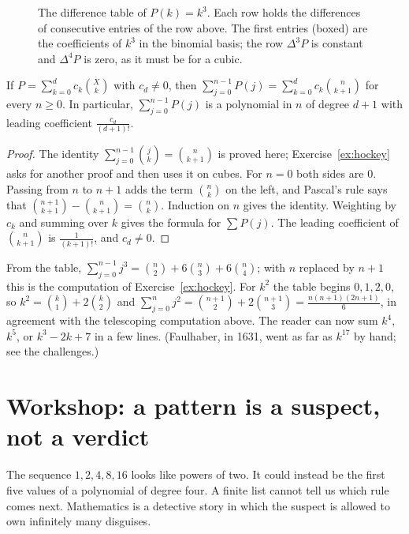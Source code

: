 \begin{figure}[ht]
\centering
{}
\caption{The difference table of $P(k)=k^3$. Each row holds the differences of consecutive entries of the row above. The first entries (boxed) are the coefficients of $k^3$ in the binomial basis; the row $\Delta^3P$ is constant and $\Delta^4P$ is zero, as it must be for a cubic.}
\label{fig:differences}
\end{figure}

\begin{corollary}\label{cor:sumpoly}
If $P=\sum_{k=0}^dc_k\binom Xk$ with $c_d\ne0$, then $\displaystyle\sum_{j=0}^{n-1}P(j)=\sum_{k=0}^dc_k\binom n{k+1}$ for every $n\ge0$.
In particular, $\sum_{j=0}^{n-1}P(j)$ is a polynomial in $n$ of degree $d+1$ with leading coefficient $\frac{c_d}{(d+1)!}$.
\end{corollary}
\begin{proof}
The identity $\sum_{j=0}^{n-1}\binom jk=\binom n{k+1}$ is proved here; Exercise~\ref{ex:hockey} asks for another proof and then uses it on cubes. For $n=0$ both sides are $0$. Passing from $n$ to $n+1$ adds the term $\binom nk$ on the left, and Pascal's rule says that $\binom{n+1}{k+1}-\binom n{k+1}=\binom nk$. Induction on $n$ gives the identity. Weighting by $c_k$ and summing over $k$ gives the formula for $\sum P(j)$. The leading coefficient of $\binom n{k+1}$ is $\frac1{(k+1)!}$, and $c_d\ne0$.
\end{proof}

\begin{examplex}
From the table, $\sum_{j=0}^{n-1}j^3=\binom n2+6\binom n3+6\binom n4$; with $n$ replaced by $n+1$ this is the computation of Exercise~\ref{ex:hockey}.
For $k^2$ the table begins $0,1,2,0$, so $k^2=\binom k1+2\binom k2$ and $\sum_{j=0}^{n}j^2=\binom{n+1}2+2\binom{n+1}3=\frac{n(n+1)(2n+1)}6$, in agreement
with the telescoping computation above. The reader can now sum $k^4$, $k^5$, or $k^3-2k+7$ in a few lines. (Faulhaber, in 1631, went as far as $k^{17}$ by hand; see the challenges.)
\end{examplex}


\section{Workshop: a pattern is a suspect, not a verdict}
The sequence $1,2,4,8,16$ looks like powers of two. It could instead be the first five values of a polynomial of degree four. A finite list cannot tell us which rule comes next. Mathematics is a detective story in which the suspect is allowed to own infinitely many disguises.

